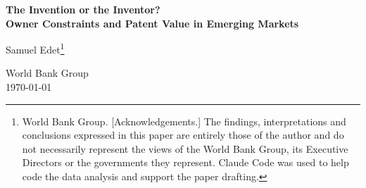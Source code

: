 \documentclass[11pt]{article}
\begin{document}
\thispagestyle{empty}

\begin{center}
{\Large\textbf{The Invention or the Inventor?\\Owner Constraints and Patent Value in Emerging Markets}}

\bigskip
{\large Samuel Edet\footnote{World Bank Group. [Acknowledgements.] The findings,
interpretations and conclusions expressed in this paper are entirely those of the author and do not necessarily
represent the views of the World Bank Group, its Executive Directors or the governments they represent. Claude Code
was used to help code the data analysis and support the paper drafting.}}

\medskip
World Bank Group\\

\bigskip
\today
\end{center}
\end{document}
